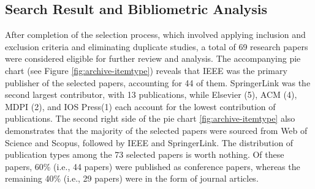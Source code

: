 \subsection{Search Result and Bibliometric Analysis}

After completion of the selection process, which involved applying inclusion and exclusion criteria and eliminating duplicate studies, a total of 69 research papers were considered eligible for further review and analysis. The accompanying pie chart (see Figure \ref{fig:archive-itemtype}) reveals that IEEE was the primary publisher of the selected papers, accounting for 44 of them. SpringerLink was the second largest contributor, with 13 publications, while Elsevier (5), ACM (4), MDPI (2), and IOS Press(1) each account for the lowest contribution of publications. The second right side of the pie chart \ref{fig:archive-itemtype} also demonstrates that the majority of the selected papers were sourced from Web of Science and Scopus, followed by IEEE and SpringerLink. The distribution of publication types among the 73 selected papers is worth nothing. Of these papers, 60\% (i.e., 44 papers) were published as conference papers, whereas the remaining 40\% (i.e., 29 papers) were in the form of journal articles.



% 
% 


